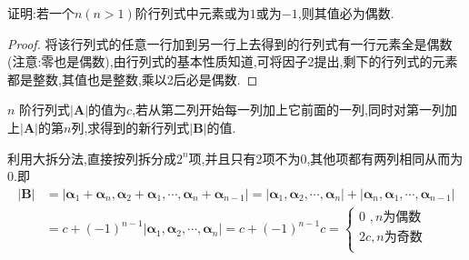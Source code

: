 \documentclass[../../main.tex]{subfiles}%
\begin{document}
\begin{example}
证明:若一个\(n(n>1)\)阶行列式中元素或为\(1\)或为\(-1\),则其值必为偶数.
\end{example}
\begin{proof}
将该行列式的任意一行加到另一行上去得到的行列式有一行元素全是偶数(注意:零也是偶数),由行列式的基本性质知道,可将因子2提出,剩下的行列式的元素都是整数,其值也是整数,乘以2后必是偶数.
\end{proof}

\begin{example}
\(n\) 阶行列式\(\vert \boldsymbol{A}\vert\)的值为\(c\),若从第二列开始每一列加上它前面的一列,同时对第一列加上\(\vert \boldsymbol{A}\vert\)的第\(n\)列,求得到的新行列式\(\vert \boldsymbol{B}\vert\)的值.
\end{example}
\begin{solution}
利用大拆分法,直接按列拆分成$2^n$项,并且只有2项不为0,其他项都有两列相同从而为0.即
\begin{align*}
\left| \boldsymbol{B} \right|&=\left| \boldsymbol{\alpha }_1+\boldsymbol{\alpha }_n,\boldsymbol{\alpha }_2+\boldsymbol{\alpha }_1,\cdots ,\boldsymbol{\alpha }_n+\boldsymbol{\alpha }_{n-1} \right|
=\left| \boldsymbol{\alpha }_1,\boldsymbol{\alpha }_2,\cdots ,\boldsymbol{\alpha }_n \right|+\left| \boldsymbol{\alpha }_n,\boldsymbol{\alpha }_1,\cdots ,\boldsymbol{\alpha }_{n-1} \right|
\\
&=c+\left( -1 \right) ^{n-1}\left| \boldsymbol{\alpha }_1,\boldsymbol{\alpha }_2,\cdots ,\boldsymbol{\alpha }_n \right|
=c+\left( -1 \right) ^{n-1}c
=\begin{cases}
0 \,\,,n\text{为偶数}\\
2c,n\text{为奇数}\\
\end{cases}
\end{align*}

\end{solution}
\end{document}
